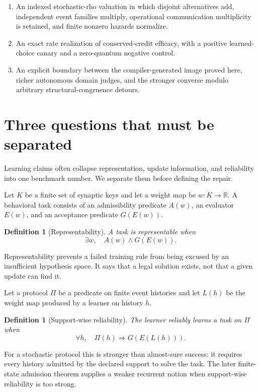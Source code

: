 \documentclass[11pt]{article}
\newtheorem{definition}[theorem]{Definition}
\begin{document}
\begin{enumerate}
  in the runtime-supported fragment.
\item An indexed stochastic-rho valuation in which disjoint alternatives add,
  independent event families multiply, operational communication
  multiplicity is retained, and finite nonzero hazards normalize.
\item An exact rate realization of conserved-credit efficacy, with a positive
  learned-choice canary and a zero-quantum negative control.
\item An explicit boundary between the compiler-generated image proved here,
  richer autonomous domain judges, and the stronger converse modulo arbitrary
  structural-congruence detours.
\end{enumerate}

\section{Three questions that must be separated}
\label{sec:adequacy}

Learning claims often collapse representation, update information, and
reliability into one benchmark number.  We separate them before defining the
repair.

Let $K$ be a finite set of synaptic keys and let a weight map be
$w:K\to\mathbb{R}$.  A behavioral task consists of an admissibility predicate
$A(w)$, an evaluator $E(w)$, and an acceptance predicate $G(E(w))$.

\begin{definition}[Representability]
A task is \emph{representable} when
\[
  \exists w,\quad A(w)\land G(E(w)).
\]
\end{definition}

Representability prevents a failed training rule from being excused by an
insufficient hypothesis space.  It says that a legal solution exists, not
that a given update can find it.

Let a protocol $\Pi$ be a predicate on finite event histories and let
$L(h)$ be the weight map produced by a learner on history $h$.

\begin{definition}[Support-wise reliability]
The learner reliably learns a task on $\Pi$ when
\[
  \forall h,\quad \Pi(h)\Longrightarrow G(E(L(h))).
\]
\end{definition}

For a stochastic protocol this is stronger than almost-sure success: it
requires every history admitted by the declared support to solve the task.
The later finite-state admission theorem supplies a weaker recurrent notion
when support-wise reliability is too strong.
\end{document}

